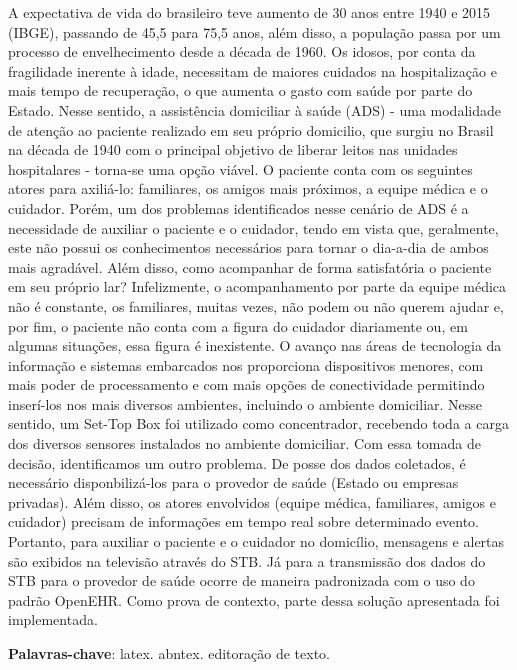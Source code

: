 \setlength{\absparsep}{18pt} %
\begin{resumo}
A expectativa de vida do brasileiro teve aumento de 30 anos entre 1940 e 2015 (IBGE), passando de 45,5 para 75,5 anos, além disso, a população passa por um processo de envelhecimento desde a década de 1960. Os idosos, por conta da fragilidade inerente à idade, necessitam de maiores cuidados na hospitalização e mais tempo de recuperação, o que aumenta o gasto com saúde por parte do Estado. 
Nesse sentido, a assistência domiciliar à saúde (ADS) - uma modalidade de atenção ao paciente realizado em seu próprio domicilio, que surgiu no Brasil na década de 1940 com o principal objetivo de liberar leitos nas unidades hospitalares - torna-se uma opção viável. O paciente conta com os seguintes atores para axiliá-lo: familiares, os amigos mais próximos, a equipe médica e o cuidador.
Porém, um dos problemas identificados nesse cenário de ADS é a necessidade de auxiliar o paciente e o cuidador, tendo em vista que, geralmente, este não possui os conhecimentos necessários para tornar o dia-a-dia de ambos mais agradável.
Além disso, como acompanhar de forma satisfatória o paciente em seu próprio lar? Infelizmente, o acompanhamento por parte da equipe médica não é constante, os familiares, muitas vezes, não podem ou não querem ajudar e, por fim, o paciente não conta com a figura do cuidador diariamente ou, em algumas situações, essa figura é inexistente. 
O avanço nas áreas de tecnologia da informação e sistemas embarcados nos proporciona dispositivos menores, com mais poder de processamento e com mais opções de conectividade permitindo inserí-los nos mais diversos ambientes, incluindo o ambiente domiciliar. Nesse sentido, um Set-Top Box foi utilizado como concentrador, recebendo toda a carga dos diversos sensores instalados no ambiente domiciliar.
Com essa tomada de decisão, identificamos um outro problema. De posse dos dados coletados, é necessário disponbilizá-los para o provedor de saúde (Estado ou empresas privadas). Além disso, os atores envolvidos (equipe médica, familiares, amigos e cuidador) precisam de informações em tempo real sobre determinado evento.
Portanto, para auxiliar o paciente e o cuidador no domicílio, mensagens e alertas são exibidos na televisão através do STB. Já para a transmissão dos dados do STB para o provedor de saúde ocorre de maneira padronizada com o uso do padrão OpenEHR. 
Como prova de contexto, parte dessa solução apresentada foi implementada.

 \textbf{Palavras-chave}: latex. abntex. editoração de texto.
\end{resumo}